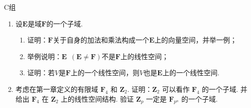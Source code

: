 \centerline{\heiti C组}
\begin{enumerate}
    \item 设$\mathbf{E}$是域$\mathbf{F}$的一个子域.
          \begin{enumerate}
              \item 证明：$\mathbf{F}$关于自身的加法和乘法构成一个$\mathbf{E}$上的向量空间，并举一例；

              \item 举例说明：$\mathbf{E}\enspace(\mathbf{E}\neq \mathbf{F})$不是$\mathbf{F}$上的线性空间；

              \item 证明：若$V$是$\mathbf{F}$上的一个线性空间，则$V$也是$\mathbf{E}$上的一个线性空间.
          \end{enumerate}

    \item 考虑在第一章定义的有限域 $\mathbf{F}_4$ 和 $\mathbf{Z}_2$. 证明：$\mathbf{Z}_2$ 可以看作 $\mathbf{F}_4$ 的一个子域. 并给出 $\mathbf{F}_4$ 在 $\mathbf{Z}_2$ 上的线性空间结构. 验证 $\mathbf{Z}_p$ 一定是 $\mathbf{F}_{p^n}$ 的一个子域.
\end{enumerate}
